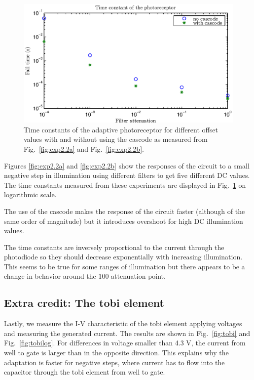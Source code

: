 \begin{figure}[H]
	\center
	\includegraphics{exp2_2c.eps}
	\caption{Time constants of the adaptive photoreceptor for different offset values with and without using the cascode as measured from Fig.~\ref{fig:exp2.2a} and Fig.~\ref{fig:exp2.2b}.}
	\label{fig:exp2.2c}
\end{figure}

Figures \ref{fig:exp2.2a} and \ref{fig:exp2.2b} show the responses of the circuit to a small negative step in illumination using different filters to get five different DC values. The time constants measured from these experiments are displayed in Fig.~\ref{fig:exp2.2c} on logarithmic scale. 

The use of the cascode makes the response of the circuit faster (although of the same order of magnitude) but it introduces overshoot for high DC illumination values. 

The time constants are inversely proportional to the current through the photodiode so they should decrease exponentially with increasing illumination. This seems to be true for some ranges of illumination but there appears to be a change in behavior around the 100 attenuation point. \\

\subsection{Extra credit: The tobi element}
Lastly, we measure the I-V characteristic of the tobi element applying voltages and measuring the generated current. The results are shown in Fig.~\ref{fig:tobi} and Fig.~\ref{fig:tobilog}. For differences in voltage smaller than 4.3 V, the current from well to gate is larger than in the opposite direction. This explains why the adaptation is faster for negative steps, where current has to flow into the capacitor through the tobi element from well to gate.

